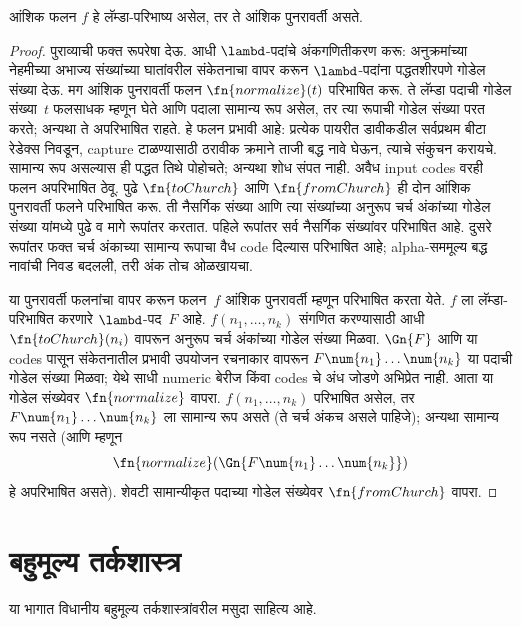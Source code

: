 \begin{thm}
  \label{lam:dfl:ldr:thm:lambda-computable} आंशिक फलन $f$
  हे लॅम्डा-परिभाष्य असेल, तर ते आंशिक
  पुनरावर्ती असते.
\end{thm}

\begin{proof}
  पुराव्याची फक्त रूपरेषा देऊ. आधी $\lambd$-पदांचे
  अंकगणितीकरण करू: अनुक्रमांच्या नेहमीच्या अभाज्य
  संख्यांच्या घातांवरील संकेतनाचा वापर करून
  $\lambd$-पदांना पद्धतशीरपणे गोडेल संख्या देऊ.
  मग आंशिक पुनरावर्ती फलन $\fn{normalize}(t)$
  परिभाषित करू. ते लॅम्डा पदाची गोडेल संख्या~$t$
  फलसाधक म्हणून घेते आणि पदाला सामान्य रूप
  असेल, तर त्या रूपाची गोडेल संख्या परत करते;
  अन्यथा ते अपरिभाषित राहते. हे फलन प्रभावी आहे:
  प्रत्येक पायरीत डावीकडील सर्वप्रथम बीटा रेडेक्स
  निवडून, capture टाळण्यासाठी ठरावीक क्रमाने ताजी
  बद्ध नावे घेऊन, त्याचे संकुचन करायचे. सामान्य रूप
  असल्यास ही पद्धत तिथे पोहोचते; अन्यथा शोध संपत नाही.
  अवैध input codes वरही फलन अपरिभाषित ठेवू. पुढे
  $\fn{toChurch}$ आणि $\fn{fromChurch}$ ही दोन
  आंशिक पुनरावर्ती फलने परिभाषित करू. ती नैसर्गिक
  संख्या आणि त्या संख्यांच्या अनुरूप चर्च अंकांच्या
  गोडेल संख्या यांमध्ये पुढे व मागे रूपांतर करतात.
  पहिले रूपांतर सर्व नैसर्गिक संख्यांवर परिभाषित आहे.
  दुसरे रूपांतर फक्त चर्च अंकाच्या सामान्य रूपाचा वैध
  code दिल्यास परिभाषित आहे; alpha-सममूल्य बद्ध
  नावांची निवड बदलली, तरी अंक तोच ओळखायचा.

  या पुनरावर्ती फलनांचा वापर करून फलन~$f$
  आंशिक पुनरावर्ती म्हणून परिभाषित करता येते.
  $f$ ला लॅम्डा-परिभाषित करणारे $\lambd$-पद~$F$
  आहे. $f(n_1, \dots, n_k)$ संगणित करण्यासाठी
  आधी $\fn{toChurch}(n_i)$ वापरून अनुरूप चर्च
  अंकांच्या गोडेल संख्या मिळवा. $\Gn{F}$ आणि या
  codes पासून संकेतनातील प्रभावी उपयोजन रचनाकार
  वापरून $F \num{n_1}\dots\num{n_k}$ या पदाची
  गोडेल संख्या मिळवा; येथे साधी numeric बेरीज किंवा
  codes चे अंध जोडणे अभिप्रेत नाही. आता या गोडेल संख्येवर
  $\fn{normalize}$ वापरा. $f(n_1, \dots, n_k)$
  परिभाषित असेल, तर
  $F \num{n_1}\dots\num{n_k}$ ला सामान्य रूप
  असते (ते चर्च अंकच असले पाहिजे); अन्यथा सामान्य
  रूप नसते (आणि म्हणून
  \[\fn{normalize}(\Gn{F\num{n_1}\dots\num{n_k}})\]
  हे अपरिभाषित असते). शेवटी सामान्यीकृत पदाच्या
  गोडेल संख्येवर $\fn{fromChurch}$ वापरा.
\end{proof}



\part{बहुमूल्य तर्कशास्त्र}\label{mvl:part}
\begin{editorial}
  या भागात विधानीय बहुमूल्य तर्कशास्त्रांवरील मसुदा साहित्य आहे.
\end{editorial}
